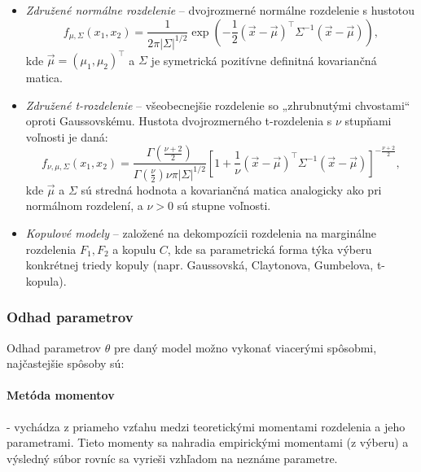 \begin{itemize}
  \item \textit{Združené normálne rozdelenie} – dvojrozmerné normálne rozdelenie s hustotou
  \begin{equation}
  f_{\mu, \Sigma}(x_1, x_2) = \frac{1}{2\pi |\Sigma|^{1/2}} \exp\left( -\frac{1}{2} (\vec{x} - \vec{\mu})^\top \Sigma^{-1} (\vec{x} - \vec{\mu}) \right),
  \end{equation}
  kde $\vec{\mu} = (\mu_1, \mu_2)^\top$ a $\Sigma$ je symetrická pozitívne definitná kovariančná matica.

   \item \textit{Združené t-rozdelenie} – všeobecnejšie rozdelenie so „zhrubnutými chvostami“ oproti Gaussovskému. Hustota dvojrozmerného t-rozdelenia s $\nu$ stupňami voľnosti je daná:
  \begin{equation}
  f_{\nu, \mu, \Sigma}(x_1, x_2) = \frac{\Gamma\left(\frac{\nu + 2}{2}\right)}{\Gamma\left(\frac{\nu}{2}\right)\nu\pi |\Sigma|^{1/2}} \left[ 1 + \frac{1}{\nu} (\vec{x} - \vec{\mu})^\top \Sigma^{-1} (\vec{x} - \vec{\mu}) \right]^{-\frac{\nu + 2}{2}},
  \end{equation}
  kde $\vec{\mu}$ a $\Sigma$ sú stredná hodnota a kovariančná matica analogicky ako pri normálnom rozdelení, a $\nu > 0$ sú stupne voľnosti.
  
  \item \textit{Kopulové modely} – založené na dekompozícii rozdelenia na marginálne rozdelenia $F_1, F_2$ a kopulu $C$, kde sa parametrická forma týka výberu konkrétnej triedy kopuly (napr. Gaussovská, Claytonova, Gumbelova, t-kopula).
\end{itemize}

\subsubsection{Odhad parametrov}\label{subsubsec:param_estimation}

Odhad parametrov $\theta$ pre daný model možno vykonať viacerými spôsobmi, najčastejšie spôsoby sú:

\paragraph{Metóda momentov} - vychádza z priameho vzťahu medzi teoretickými momentami rozdelenia a jeho parametrami. Tieto momenty sa nahradia empirickými momentami (z výberu) a výsledný súbor rovníc sa vyrieši vzhľadom na neznáme parametre.

